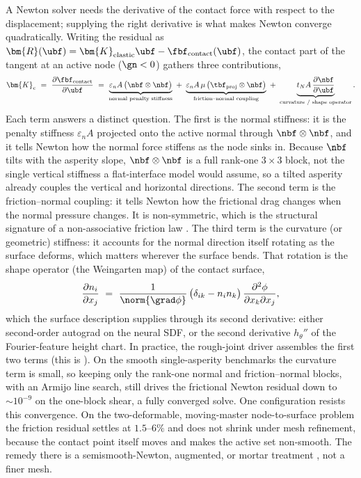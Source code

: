 A Newton solver needs the derivative of the contact force with respect to the displacement; supplying
the right derivative is what makes Newton converge quadratically. Writing the residual as
$\bm{R}(\ubf)=\bm{K}_{\mathrm{elastic}}\ubf-\fbf_{\mathrm{contact}}(\ubf)$, the contact part of the
tangent at an active node ($\gn<0$) gathers three contributions,
\begin{equation}\label{eq:contact-tangent}
\bm{K}_c\ =\ \frac{\partial \fbf_{\mathrm{contact}}}{\partial \ubf}
\ =\ \underbrace{\varepsilon_n A\,\big(\nbf\otimes\nbf\big)}_{\text{normal penalty stiffness}}
\ +\ \underbrace{\varepsilon_n A\,\mu\,\big(\tbf_{\mathrm{proj}}\otimes\nbf\big)}_{\text{friction--normal coupling}}
\ +\ \underbrace{t_N A\,\frac{\partial\nbf}{\partial\ubf}}_{\text{curvature / shape operator}} .
\end{equation}
Each term answers a distinct question. The first is the normal stiffness: it is the penalty stiffness
$\varepsilon_n A$ projected onto the active normal through $\nbf\otimes\nbf$, and it tells Newton how
the normal force stiffens as the node sinks in. Because $\nbf$ tilts with the asperity slope,
$\nbf\otimes\nbf$ is a full rank-one $3\times3$ block, not the single vertical stiffness a
flat-interface model would assume, so a tilted asperity already couples the vertical and horizontal
directions. The second term is the friction--normal coupling: it tells Newton how the frictional drag
changes when the normal pressure changes. It is non-symmetric, which is the structural signature of a
non-associative friction law \citep{wriggers2006computational}. The third term is the curvature (or
geometric) stiffness: it accounts for the normal direction itself rotating as the surface deforms,
which matters wherever the surface bends. That rotation is the shape operator (the Weingarten map) of
the contact surface,
\begin{equation}\label{eq:shape-operator}
\frac{\partial n_i}{\partial x_j}
\ =\ \frac{1}{\norm{\grad\phi}}\,\big(\delta_{ik}-n_i n_k\big)\,
\frac{\partial^2\phi}{\partial x_k\partial x_j},
\end{equation}
which the surface description supplies through its second derivative: either second-order autograd on
the neural SDF, or the second derivative $h_\theta''$ of the Fourier-feature height chart. In
practice, the rough-joint driver assembles the first two terms (this is
). On the smooth single-asperity benchmarks the curvature term is small, so
keeping only the rank-one normal and friction--normal blocks, with an Armijo line search, still drives
the frictional Newton residual down to $\sim10^{-9}$ on the one-block shear, a fully converged solve.
One configuration resists this convergence. On the two-deformable, moving-master node-to-surface
problem the friction residual settles at $1.5$--$6\%$ and does not shrink under mesh refinement,
because the contact point itself moves and makes the active set non-smooth. The remedy there is a
semismooth-Newton, augmented, or mortar treatment
\citep{alart1991mixed,puso2004mortar,chouly2013nitsche}, not a finer mesh.


